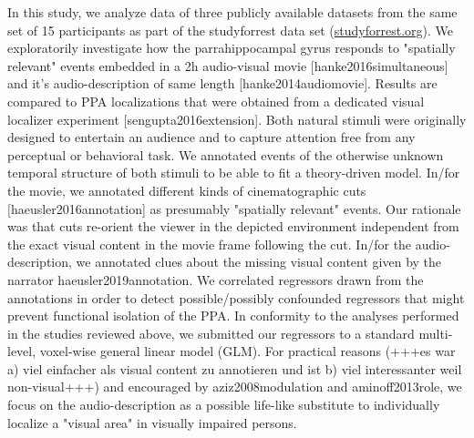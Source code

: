 \documentclass[english]{article}
\begin{document}
In this study, we analyze data of three publicly available datasets from the same set of 15 participants as part of the studyforrest data set (\href{http://www.studyforrest.org}{studyforrest.org}). We exploratorily investigate how the parrahippocampal gyrus responds to "spatially relevant" events embedded in a 2h audio-visual movie [hanke2016simultaneous] and it's audio-description of same length [hanke2014audiomovie]. Results are compared to PPA localizations that were obtained from a dedicated visual localizer experiment [sengupta2016extension]. Both natural stimuli were originally designed to entertain an audience and to capture attention free from any perceptual or behavioral task. We annotated events of the otherwise unknown temporal structure of both stimuli to be able to fit a theory-driven model. In/for the movie, we annotated different kinds of cinematographic cuts [haeusler2016annotation] as presumably "spatially relevant" events. Our rationale was that cuts re-orient the viewer in the depicted environment independent from the exact visual content in the movie frame following the cut. In/for the audio-description, we annotated clues about the missing visual content given by the narrator {haeusler2019annotation}. We correlated regressors drawn from the annotations in order to detect possible/possibly confounded regressors that might prevent functional isolation of the PPA. In conformity to the analyses performed in the studies reviewed above, we submitted our regressors to a standard multi-level, voxel-wise general linear model (GLM). For practical reasons (+++es war a) viel einfacher als visual content zu annotieren und ist b) viel interessanter weil non-visual+++) and encouraged by {aziz2008modulation} and {aminoff2013role}, we focus on the audio-description as a possible life-like substitute to individually localize a "visual area" in visually impaired persons.
\end{document}
